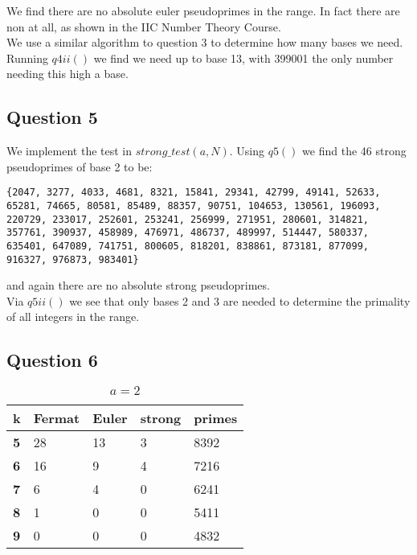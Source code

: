 \documentclass[10pt,a4paper]{report}
\begin{document}
We find there are no absolute euler pseudoprimes in the range. In fact there are non at all, as shown in the IIC Number Theory Course.\\

We use a similar algorithm to question 3 to determine how many bases we need. Running $q4ii()$ we find we need  up to base 13, with 399001 the only number needing this high a base.

\subsection*{Question 5}

We implement the test in $strong\_test(a,N)$. Using $q5()$ we find the 46 strong pseudoprimes of base 2 to be:

\begin{lstlisting}[breaklines]
{2047, 3277, 4033, 4681, 8321, 15841, 29341, 42799, 49141, 52633, 65281, 74665, 80581, 85489, 88357, 90751, 104653, 130561, 196093, 220729, 233017, 252601, 253241, 256999, 271951, 280601, 314821, 357761, 390937, 458989, 476971, 486737, 489997, 514447, 580337, 635401, 647089, 741751, 800605, 818201, 838861, 873181, 877099, 916327, 976873, 983401}
\end{lstlisting}

and again there are no absolute strong pseudoprimes.\\

Via $q5ii()$ we see that only bases 2 and 3 are needed to determine the primality of all integers in the range.

\subsection*{Question 6}

\begin{table}[h]
\centering
\begin{tabular}{|l|l|l|l|l|}
\hline
\textbf{k} & \textbf{Fermat} & \textbf{Euler} & \textbf{strong} & \textbf{primes} \\ \hline
\textbf{5} & 28              & 13             & 3               & 8392            \\ \hline
\textbf{6} & 16              & 9              & 4               & 7216            \\ \hline
\textbf{7} & 6               & 4              & 0               & 6241            \\ \hline
\textbf{8} & 1               & 0              & 0               & 5411            \\ \hline
\textbf{9} & 0               & 0              & 0               & 4832            \\ \hline
\end{tabular}
\caption{$a=2$}
\end{table}
\end{document}
